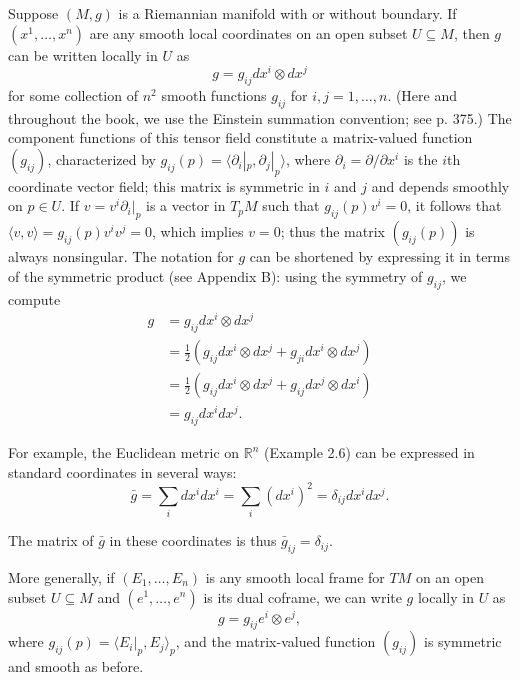 Suppose $(M,g)$ is a Riemannian manifold with or without boundary. If $(x^1,\ldots,x^n)$ are any smooth local coordinates on an open subset $U \subseteq M$, then $g$ can be written locally in $U$ as
\begin{equation*}
g = g_{ij} dx^i \otimes dx^j \tag{2.7}
\end{equation*}
for some collection of $n^2$ smooth functions $g_{ij}$ for $i,j = 1,\ldots,n$. (Here and throughout the book, we use the Einstein summation convention; see p. 375.) The component functions of this tensor field constitute a matrix-valued function $(g_{ij})$, characterized by $g_{ij}(p) = \langle \partial_i|_p, \partial_j|_p \rangle$, where $\partial_i = \partial/\partial x^i$ is the $i$th coordinate vector field; this matrix is symmetric in $i$ and $j$ and depends smoothly on $p \in U$. If $v = v^i \partial_i|_p$ is a vector in $T_p M$ such that $g_{ij}(p)v^i = 0$, it follows that $\langle v,v \rangle = g_{ij}(p) v^i v^j = 0$, which implies $v = 0$; thus the matrix $(g_{ij}(p))$ is always nonsingular. The notation for $g$ can be shortened by expressing it in terms of the symmetric product (see Appendix B): using the symmetry of $g_{ij}$, we compute
\begin{align*}
g &= g_{ij} dx^i \otimes dx^j \\
  &= \tfrac{1}{2}(g_{ij} dx^i \otimes dx^j + g_{ji} dx^i \otimes dx^j) \\
  &= \tfrac{1}{2}(g_{ij} dx^i \otimes dx^j + g_{ij} dx^j \otimes dx^i) \\
  &= g_{ij} dx^i dx^j.
\end{align*}

For example, the Euclidean metric on $\mathbb{R}^n$ (Example 2.6) can be expressed in standard coordinates in several ways:
\begin{equation*}
\bar{g} = \sum_i dx^i dx^i = \sum_i (dx^i)^2 = \delta_{ij} dx^i dx^j. \tag{2.8}
\end{equation*}

The matrix of $\bar{g}$ in these coordinates is thus $\bar{g}_{ij} = \delta_{ij}$.

More generally, if $(E_1,\ldots,E_n)$ is any smooth local frame for $TM$ on an open subset $U \subseteq M$ and $(e^1,\ldots,e^n)$ is its dual coframe, we can write $g$ locally in $U$ as
\begin{equation*}
g = g_{ij} e^i \otimes e^j, \tag{2.9}
\end{equation*}
where $g_{ij}(p) = \langle E_i|_p, E_j \rangle_p$, and the matrix-valued function $(g_{ij})$ is symmetric and smooth as before.

